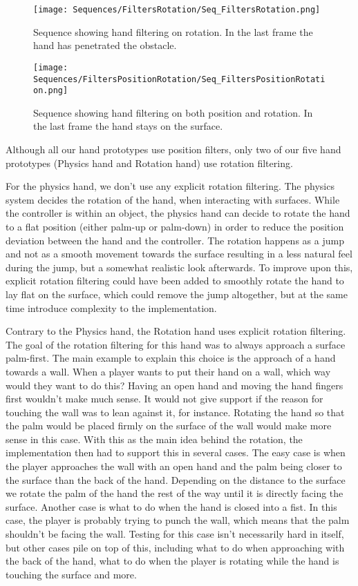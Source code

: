 \begin{figure}[H]
\centering
\texttt{[image: Sequences/FiltersRotation/Seq\_FiltersRotation.png]}
\caption{Sequence showing hand filtering on rotation. In the last frame the hand has penetrated the obstacle.}
\label{fig:filtersRotation}
\end{figure}

\begin{figure}[H]
\centering
\texttt{[image: Sequences/FiltersPositionRotation/Seq\_FiltersPositionRotation.png]}
\caption{Sequence showing hand filtering on both position and rotation. In the last frame the hand stays on the surface.}
\label{fig:filtersPositionRotation}
\end{figure}

Although all our hand prototypes use position filters, only two of our five hand prototypes (Physics hand and Rotation hand) use rotation filtering.

For the physics hand, we don't use any explicit rotation filtering. The physics system decides the rotation of the hand, when interacting with surfaces. While the controller is within an object, the physics hand can decide to rotate the hand to a flat position (either palm-up or palm-down) in order to reduce the position deviation between the hand and the controller. The rotation happens as a jump and not as a smooth movement towards the surface resulting in a less natural feel during the jump, but a somewhat realistic look afterwards. To improve upon this, explicit rotation filtering could have been added to smoothly rotate the hand to lay flat on the surface, which could remove the jump altogether, but at the same time introduce complexity to the implementation.

Contrary to the Physics hand, the Rotation hand uses explicit rotation filtering. The goal of the rotation filtering for this hand was to always approach a surface palm-first. The main example to explain this choice is the approach of a hand towards a wall. When a player wants to put their hand on a wall, which way would they want to do this? Having an open hand and moving the hand fingers first wouldn't make much sense. It would not give support if the reason for touching the wall was to lean against it, for instance. Rotating the hand so that the palm would be placed firmly on the surface of the wall would make more sense in this case. With this as the main idea behind the rotation, the implementation then had to support this in several cases. The easy case is when the player approaches the wall with an open hand and the palm being closer to the surface than the back of the hand. Depending on the distance to the surface we rotate the palm of the hand the rest of the way until it is directly facing the surface. Another case is what to do when the hand is closed into a fist. In this case, the player is probably trying to punch the wall, which means that the palm shouldn't be facing the wall. Testing for this case isn't necessarily hard in itself, but other cases pile on top of this, including what to do when approaching with the back of the hand, what to do when the player is rotating while the hand is touching the surface and more.

